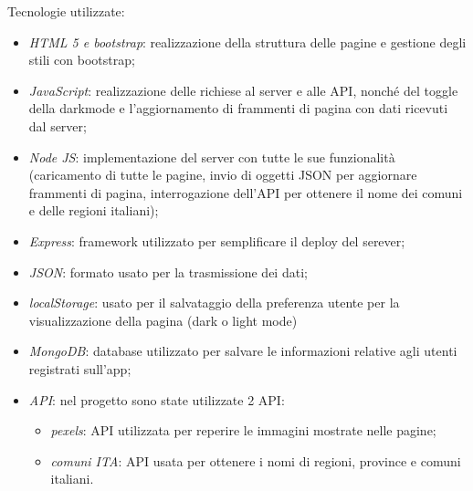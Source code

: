 Tecnologie utilizzate:
\begin{itemize}
    \item \emph{HTML 5 e bootstrap}: realizzazione della struttura delle pagine e gestione degli stili con bootstrap;
    \item \emph{JavaScript}: realizzazione delle richiese al server e alle API, nonché del toggle della darkmode e l'aggiornamento 
    di frammenti di pagina con dati ricevuti dal server; 
    \item \emph{Node JS}: implementazione del server con tutte le sue funzionalità (caricamento di tutte le pagine, 
    invio di oggetti JSON per aggiornare frammenti di pagina, interrogazione dell'API per ottenere il nome dei comuni e delle 
    regioni italiani);
    \item \emph{Express}: framework utilizzato per semplificare il deploy del serever;
    \item \emph{JSON}: formato usato per la trasmissione dei dati;
    \item \emph{localStorage}: usato per il salvataggio della preferenza utente per la visualizzazione della pagina (dark o light mode)
    \item \emph{MongoDB}: database utilizzato per salvare le informazioni relative agli utenti registrati sull'app;
    \item \emph{API}: nel progetto sono state utilizzate 2 API:
    \begin{itemize}
        \item \emph{pexels}: API utilizzata per reperire le immagini mostrate nelle pagine;
        \item \emph{comuni ITA}: API usata per ottenere i nomi di regioni, province e comuni italiani.
    \end{itemize}
\end{itemize}

